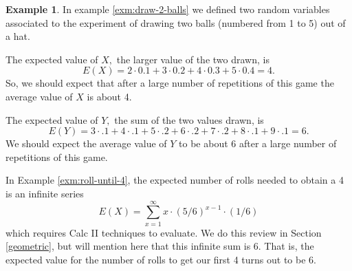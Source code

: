\documentclass[
]{book}
\theoremstyle{definition}
\theoremstyle{definition}
\newtheorem{example}{Example}[chapter]
\theoremstyle{definition}
\theoremstyle{definition}
\theoremstyle{remark}
\begin{document}
\begin{example}
\protect\hypertarget{exm:first-EV}{}\label{exm:first-EV}In example \ref{exm:draw-2-balls} we defined two random variables associated to the experiment of drawing two balls (numbered from 1 to 5) out of a hat.

The expected value of \(X,\) the larger value of the two drawn, is \[E(X) = 2 \cdot 0.1 + 3 \cdot 0.2 + 4 \cdot 0.3 + 5 \cdot 0.4 = 4.\] So, we should expect that after a large number of repetitions of this game the average value of \(X\) is about 4.

The expected value of \(Y,\) the sum of the two values drawn, is \[E(Y) = 3 \cdot .1 + 4 \cdot .1 + 5 \cdot .2 + 6 \cdot .2 + 7 \cdot .2 + 8 \cdot .1 + 9 \cdot .1 = 6.\] We should expect the average value of \(Y\) to be about 6 after a large number of repetitions of this game.

In Example \ref{exm:roll-until-4}, the expected number of rolls needed to obtain a 4 is an infinite series
\[E(X) = \sum_{x = 1}^\infty x \cdot (5/6)^{x-1} \cdot (1/6)\]
which requires Calc II techniques to evaluate. We do this review in Section \ref{geometric}, but will mention here that this infinite sum is 6. That is, the expected value for the number of rolls to get our first 4 turns out to be 6.
\end{example}
\end{document}

